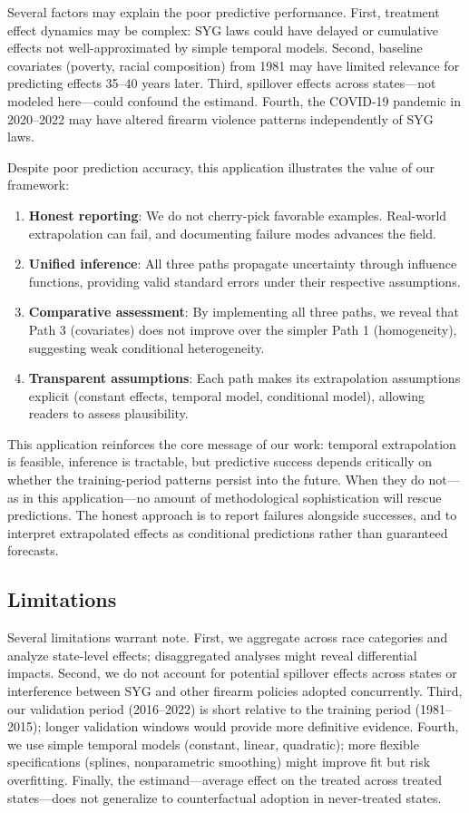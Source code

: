 Several factors may explain the poor predictive performance. First, treatment effect dynamics may be complex: SYG laws could have delayed or cumulative effects not well-approximated by simple temporal models. Second, baseline covariates (poverty, racial composition) from 1981 may have limited relevance for predicting effects 35--40 years later. Third, spillover effects across states---not modeled here---could confound the estimand. Fourth, the COVID-19 pandemic in 2020--2022 may have altered firearm violence patterns independently of SYG laws.

Despite poor prediction accuracy, this application illustrates the value of our framework:
\begin{enumerate}
\item \textbf{Honest reporting}: We do not cherry-pick favorable examples. Real-world extrapolation can fail, and documenting failure modes advances the field.
\item \textbf{Unified inference}: All three paths propagate uncertainty through influence functions, providing valid standard errors under their respective assumptions.
\item \textbf{Comparative assessment}: By implementing all three paths, we reveal that Path 3 (covariates) does not improve over the simpler Path 1 (homogeneity), suggesting weak conditional heterogeneity.
\item \textbf{Transparent assumptions}: Each path makes its extrapolation assumptions explicit (constant effects, temporal model, conditional model), allowing readers to assess plausibility.
\end{enumerate}

This application reinforces the core message of our work: temporal extrapolation is feasible, inference is tractable, but predictive success depends critically on whether the training-period patterns persist into the future. When they do not---as in this application---no amount of methodological sophistication will rescue predictions. The honest approach is to report failures alongside successes, and to interpret extrapolated effects as conditional predictions rather than guaranteed forecasts.

\subsection{Limitations}

Several limitations warrant note. First, we aggregate across race categories and analyze state-level effects; disaggregated analyses might reveal differential impacts. Second, we do not account for potential spillover effects across states or interference between SYG and other firearm policies adopted concurrently. Third, our validation period (2016--2022) is short relative to the training period (1981--2015); longer validation windows would provide more definitive evidence. Fourth, we use simple temporal models (constant, linear, quadratic); more flexible specifications (splines, nonparametric smoothing) might improve fit but risk overfitting. Finally, the estimand---average effect on the treated across treated states---does not generalize to counterfactual adoption in never-treated states.
